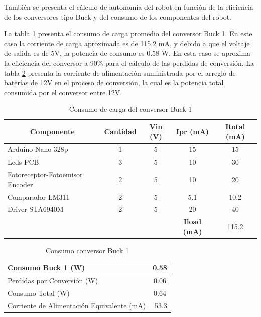 También se presenta el cálculo de autonomía del robot en función de la eficiencia de los conversores tipo Buck y del consumo de los componentes del robot.

La tabla \ref{Buck1} presenta el consumo de carga promedio del conversor Buck 1. En este caso la corriente de carga aproximada es de 115.2 mA, y debido a que el voltaje de salida es de 5V, la potencia de consumo es 0.58 W. En esta caso se aproxima la eficiencia del conversor a 90\% para el cálculo de las perdidas de conversión. La tabla \ref{Buck1Perdidas} presenta la corriente de alimentación suministrada por el arreglo de baterías de 12V en el proceso de conversión, la cual es la potencia total consumida por el conversor entre 12V.

\begin{table}[htbp]
	\caption{Consumo de carga del conversor Buck 1}
	\centering
	\begin{tabular}{|l|c|c|c|c|}
		\hline
		\multicolumn{1}{|c|}{\textbf{Componente}} & \textbf{Cantidad} & \textbf{ Vin (V)} & \textbf{ Ipr (mA)} & \textbf{Itotal (mA)} \\ \hline
		Arduino Nano 328p & 1 & 5 & 15 & 15 \\ \hline
		Leds PCB & 3 & 5 & 10 & 30 \\ \hline
		Fotoreceptor-Fotoemisor Encoder & 2 & 5 & 10 & 20 \\ \hline
		Comparador LM311 & 2 & 5 & 5.1 & 10.2 \\ \hline
		Driver STA6940M & 2 & 5 & 20 & 40 \\ \hline
		& \multicolumn{1}{l|}{} & \multicolumn{1}{l|}{} & \textbf{Iload (mA)} & 115.2 \\ \hline
	\end{tabular}
	\label{Buck1}
\end{table}



\begin{table}[htbp]
	\caption{Consumo conversor Buck 1}
	\centering
	\begin{tabular}{|l|c|}
		\hline
		Consumo Buck 1 (W) & 0.58 \\ \hline
		Perdidas por Conversión (W) & 0.06 \\ \hline
		Consumo Total (W) & 0.64 \\ \hline
		Corriente de Alimentación Equivalente (mA) & \multicolumn{1}{r|}{53.3} \\ \hline
	\end{tabular}
	\label{Buck1Perdidas}
\end{table}


